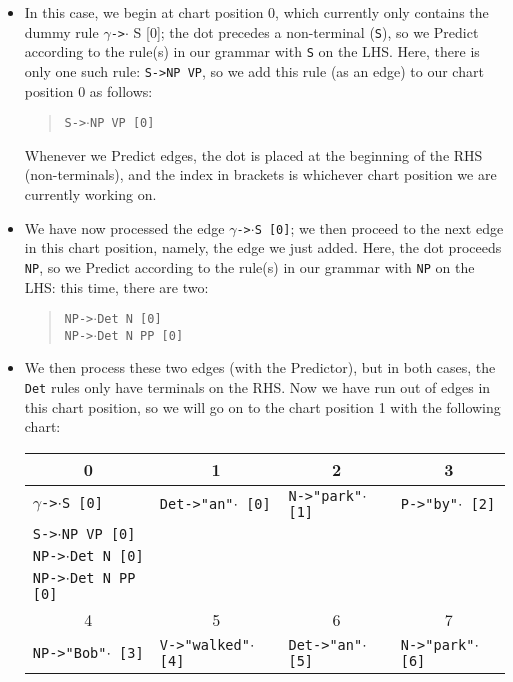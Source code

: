 \documentclass[a4paper]{article}
\begin{document}
\begin{enumerate}
\begin{enumerate}
\begin{enumerate}
\begin{itemize}
\begin{itemize}
\end{itemize}
\item In this case, we begin at chart position 0, which currently only contains the dummy rule $\gamma$\texttt{->}$\cdot${ S [0]}; the dot precedes a non-terminal (\texttt{S}), so we Predict according to the rule(s) in our grammar with \texttt{S} on the LHS. Here, there is only one such rule: \texttt{S->NP VP}, so we add this rule (as an edge) to our chart position 0 as follows:
\begin{quote}
\texttt{S->}$\cdot$\texttt{NP VP [0]}
\end{quote}
Whenever we Predict edges, the dot is placed at the beginning of the RHS (non-terminals), and the index in brackets is whichever chart position we are currently working on.
\item We have now processed the edge $\gamma$\texttt{->}$\cdot$\texttt{S [0]}; we then proceed to the next edge in this chart position, namely, the edge we just added. Here, the dot proceeds \texttt{NP}, so we Predict according to the rule(s) in our grammar with \texttt{NP} on the LHS: this time, there are two:
\begin{quote}
\texttt{NP->}$\cdot$\texttt{Det N [0]}\\
\texttt{NP->}$\cdot$\texttt{Det N PP [0]}
\end{quote}
\item We then process these two edges (with the Predictor), but in both cases, the \texttt{Det} rules only have terminals on the RHS. Now we have run out of edges in this chart position, so we will go on to the chart position 1 with the following chart:
\begin{table}[hp]
\centering
\begin{tabular}{l|l|l|l}
\multicolumn{1}{c}{0} & \multicolumn{1}{c}{1} &\multicolumn{1}{c}{2} & \multicolumn{1}{c}{3} \\
\hline
$\gamma$\texttt{->}$\cdot$\texttt{S [0]} & \texttt{Det->"an"}$\cdot$\texttt{ [0]} & \texttt{N->"park"}$\cdot$\texttt{ [1]} & \texttt{P->"by"}$\cdot$\texttt{ [2]} \\
\texttt{S->}$\cdot$\texttt{NP VP [0]} & & & \\
\texttt{NP->}$\cdot$\texttt{Det N [0]} & & & \\
\texttt{NP->}$\cdot$\texttt{Det N PP [0]} & & & \\
\hline
\multicolumn{1}{c}{4} & \multicolumn{1}{c}{5} & \multicolumn{1}{c}{6} & \multicolumn{1}{c}{7} \\
\hline
\texttt{NP->"Bob"}$\cdot$\texttt{ [3]} & \texttt{V->"walked"}$\cdot$\texttt{ [4]} & \texttt{Det->"an"}$\cdot$\texttt{ [5]} & \texttt{N->"park"}$\cdot$\texttt{ [6]} \\

\end{tabular}
\end{table}
\end{itemize}
\end{enumerate}
\end{enumerate}
\end{enumerate}
\end{document}
